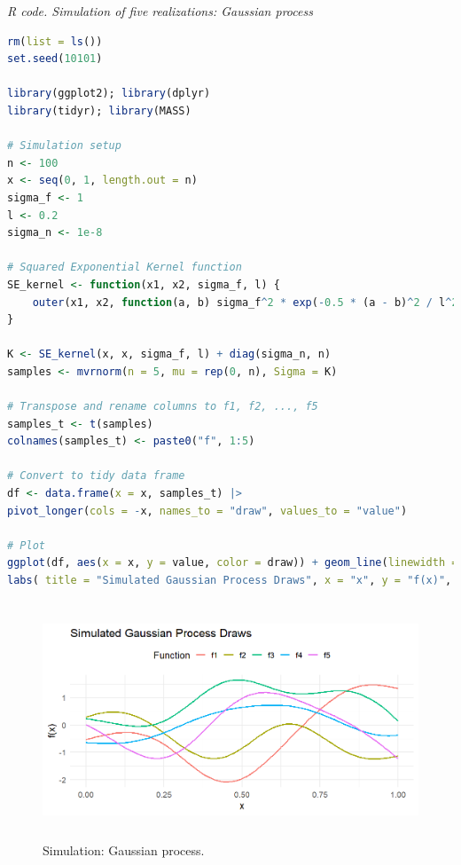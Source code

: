 \begin{tcolorbox}[enhanced,width=4.67in,center upper,
	fontupper=\large\bfseries,drop shadow southwest,sharp corners]
	\textit{R code. Simulation of five realizations: Gaussian process}
	\begin{VF}
		\begin{lstlisting}[language=R]
rm(list = ls())
set.seed(10101)

library(ggplot2); library(dplyr)
library(tidyr); library(MASS)

# Simulation setup
n <- 100
x <- seq(0, 1, length.out = n)
sigma_f <- 1
l <- 0.2
sigma_n <- 1e-8

# Squared Exponential Kernel function
SE_kernel <- function(x1, x2, sigma_f, l) {
	outer(x1, x2, function(a, b) sigma_f^2 * exp(-0.5 * (a - b)^2 / l^2))
}

K <- SE_kernel(x, x, sigma_f, l) + diag(sigma_n, n)
samples <- mvrnorm(n = 5, mu = rep(0, n), Sigma = K)

# Transpose and rename columns to f1, f2, ..., f5
samples_t <- t(samples)
colnames(samples_t) <- paste0("f", 1:5)

# Convert to tidy data frame
df <- data.frame(x = x, samples_t) |>
pivot_longer(cols = -x, names_to = "draw", values_to = "value")

# Plot
ggplot(df, aes(x = x, y = value, color = draw)) + geom_line(linewidth = 1) +
labs( title = "Simulated Gaussian Process Draws", x = "x", y = "f(x)", color = "Function" ) + theme_minimal(base_size = 14) + theme(legend.position = "top")
\end{lstlisting}
	\end{VF}
\end{tcolorbox}

\begin{figure}[!h]
	\centering
	\includegraphics[width=340pt, height=200pt]{Chapters/chapter13/figures/GPsim.png}
	\caption{Simulation: Gaussian process.}
	\label{figGPsim}
\end{figure}

